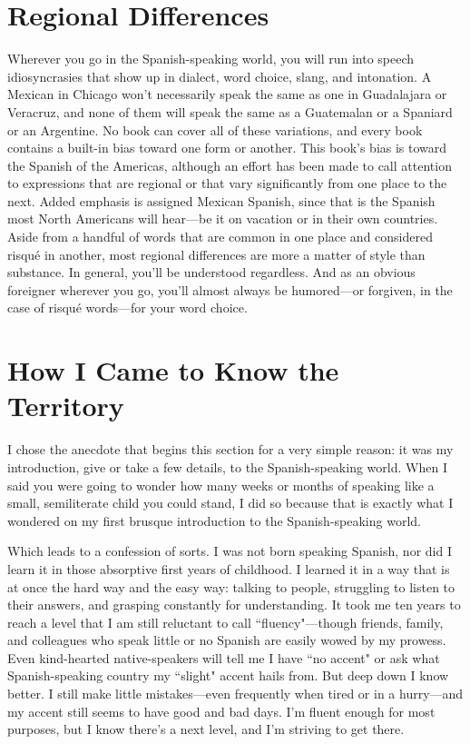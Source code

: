 \section{Regional Differences}

Wherever you go in the Spanish-speaking world, you will run
into speech idiosyncrasies that show up in dialect, word choice, slang,
and intonation. A Mexican in Chicago won't necessarily speak the
same as one in Guadalajara or Veracruz, and none of them will speak
the same as a Guatemalan or a Spaniard or an Argentine. No book can
cover all of these variations, and every book contains a built-in bias
toward one form or another. This book's bias is toward the Spanish of
the Americas, although an effort has been made to call attention to
expressions that are regional or that vary significantly from one place to
the next. Added emphasis is assigned Mexican Spanish, since that is
the Spanish most North Americans will hear---be it on vacation or in
their own countries. Aside from a handful of words that are common
in one place and considered risqué in another, most regional differences are more a matter of style than substance. In general, you'll be
understood regardless. And as an obvious foreigner wherever you go,
you'll almost always be humored---or forgiven, in the case of risqué
words---for your word choice.

\section{How I Came to Know the Territory}

I chose the anecdote that begins this section for a very simple
reason: it was my introduction, give or take a few details, to the
Spanish-speaking world. When I said you were going to wonder how
many weeks or months of speaking like a small, semiliterate child
you could stand, I did so because that is exactly what I wondered on
my first brusque introduction to the Spanish-speaking world.

Which leads to a confession of sorts. I was not born speaking
Spanish, nor did I learn it in those absorptive first years of childhood. I
learned it in a way that is at once the hard way and the easy way: talking to people, struggling to listen to their answers, and grasping constantly for understanding. It took me ten years to reach a level that I
am still reluctant to call ``fluency"---though friends, family, and colleagues who speak little or no Spanish are easily wowed by my prowess. Even kind-hearted native-speakers will tell me I have ``no accent"
or ask what Spanish-speaking country my ``slight" accent hails from.
But deep down I know better. I still make little mistakes---even frequently when tired or in a hurry---and my accent still seems to have
good and bad days. I'm fluent enough for most purposes, but I know
there's a next level, and I'm striving to get there.

